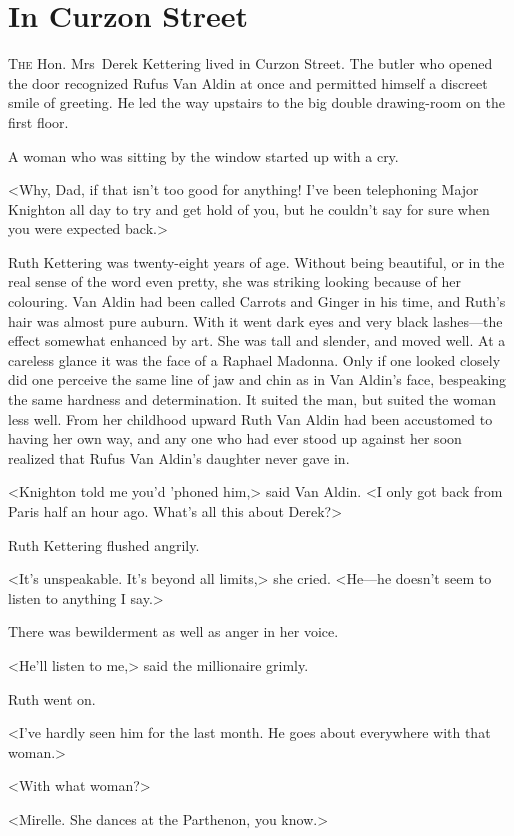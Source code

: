 \chapter{In Curzon Street}



\lettrine{T}{he} Hon. Mrs~Derek Kettering lived in Curzon Street. The butler who opened the door recognized Rufus Van Aldin at once and permitted himself a discreet smile of greeting. He led the way upstairs to the big double drawing-room on the first floor.

A woman who was sitting by the window started up with a cry.

<Why, Dad, if that isn't too good for anything! I've been telephoning Major Knighton all day to try and get hold of you, but he couldn't say for sure when you were expected back.>

Ruth Kettering was twenty-eight years of age. Without being beautiful, or in the real sense of the word even pretty, she was striking looking because of her colouring. Van Aldin had been called Carrots and Ginger in his time, and Ruth's hair was almost pure auburn. With it went dark eyes and very black lashes—the effect somewhat enhanced by art. She was tall and slender, and moved well. At a careless glance it was the face of a Raphael Madonna. Only if one looked closely did one perceive the same line of jaw and chin as in Van Aldin's face, bespeaking the same hardness and determination. It suited the man, but suited the woman less well. From her childhood upward Ruth Van Aldin had been accustomed to having her own way, and any one who had ever stood up against her soon realized that Rufus Van Aldin's daughter never gave in.

<Knighton told me you'd 'phoned him,> said Van Aldin. <I only got back from Paris half an hour ago. What's all this about Derek?>

Ruth Kettering flushed angrily.

<It's unspeakable. It's beyond all limits,> she cried. <He—he doesn't seem to listen to anything I say.>

There was bewilderment as well as anger in her voice.

<He'll listen to me,> said the millionaire grimly.

Ruth went on.

<I've hardly seen him for the last month. He goes about everywhere with that woman.>

<With what woman?>

<Mirelle. She dances at the Parthenon, you know.>

